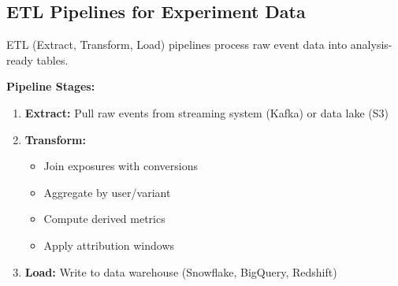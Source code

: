 \subsection{ETL Pipelines for Experiment Data}

ETL (Extract, Transform, Load) pipelines process raw event data into analysis-ready tables.

\textbf{Pipeline Stages:}

\begin{enumerate}
    \item \textbf{Extract:} Pull raw events from streaming system (Kafka) or data lake (S3)
    \item \textbf{Transform:}
    \begin{itemize}
        \item Join exposures with conversions
        \item Aggregate by user/variant
        \item Compute derived metrics
        \item Apply attribution windows
    \end{itemize}
    \item \textbf{Load:} Write to data warehouse (Snowflake, BigQuery, Redshift)
\end{enumerate}

